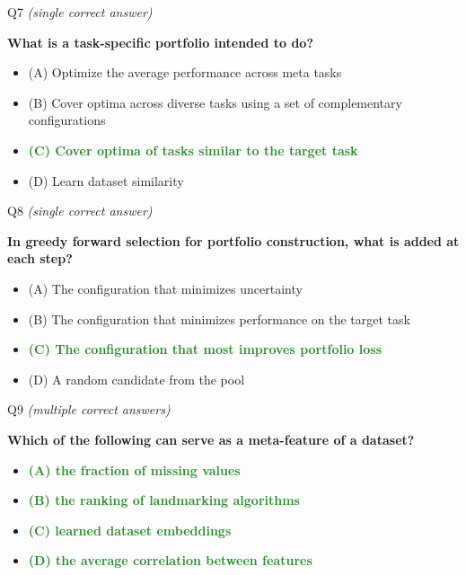 \documentclass[main]{subfiles}
\newcommand{\correct}[1]{\textcolor{ForestGreen}{\textbf{#1} \checkmark}}
\newcommand{\wrong}[1]{#1}
\begin{document}
\begin{frame}{Q7 \hfill \small\normalfont\textit{(single correct answer)}}

\textbf{What is a task-specific portfolio intended to do?}

\begin{itemize}
    \item \wrong{(A) \; Optimize the average performance across meta tasks}
    \item \wrong{(B) \; Cover optima across diverse tasks using a set of complementary configurations}
    \item \correct{(C) \; Cover optima of tasks similar to the target task}
    \item \wrong{(D) \; Learn dataset similarity}
\end{itemize}

\end{frame}
\begin{frame}{Q8 \hfill \small\normalfont\textit{(single correct answer)}}

\textbf{In greedy forward selection for portfolio construction, what is added at each step?}

\begin{itemize}
    \item \wrong{(A) \; The configuration that minimizes uncertainty}
    \item \wrong{(B) \; The configuration that minimizes performance on the target task}
    \item \correct{(C) \; The configuration that most improves portfolio loss}
    \item \wrong{(D) \; A random candidate from the pool}
\end{itemize}

\end{frame}
\begin{frame}{Q9 \hfill \small\normalfont\textit{(multiple correct answers)}}

\textbf{Which of the following can serve as a meta-feature of a dataset?}

\begin{itemize}
    \item \correct{(A) \; the fraction of missing values}
    \item \correct{(B) \; the ranking of landmarking algorithms}
    \item \correct{(C) \; learned dataset embeddings}
    \item \correct{(D) \; the average correlation between features}
\end{itemize}

\end{frame}
\end{document}
